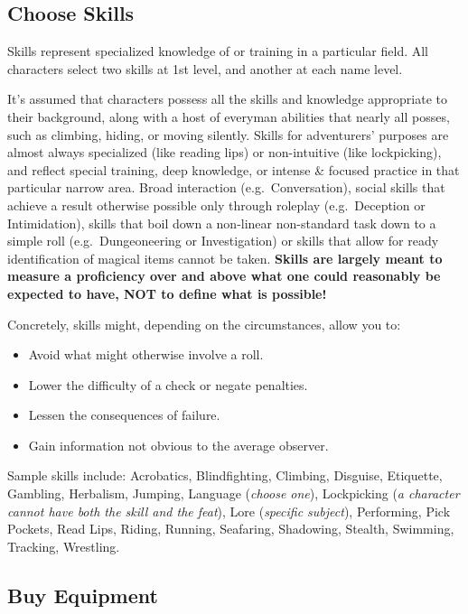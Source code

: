 \documentclass{article}
\begin{document}
\begin{multicols}{2}
\subsection{Choose Skills}\label{choose-skills}

Skills represent specialized knowledge of or training in a particular
field. All characters select two skills at 1st level, and another at
each name level.

It's assumed that characters possess all the skills and knowledge
appropriate to their background, along with a host of everyman abilities
that nearly all posses, such as climbing, hiding, or moving silently.
Skills for adventurers' purposes are almost always specialized (like
reading lips) or non-intuitive (like lockpicking), and reflect special
training, deep knowledge, or intense \& focused practice in that
particular narrow area. Broad interaction (e.g.~Conversation), social
skills that achieve a result otherwise possible only through roleplay
(e.g.~Deception or Intimidation), skills that boil down a non-linear
non-standard task down to a simple roll (e.g.~Dungeoneering or
Investigation) or skills that allow for ready identification of magical
items cannot be taken. \textbf{Skills are largely meant to measure a
proficiency over and above what one could reasonably be expected to
have, NOT to define what is possible!}

Concretely, skills might, depending on the circumstances, allow you to:

\begin{itemize}
\tightlist
\item
  Avoid what might otherwise involve a roll.
\item
  Lower the difficulty of a check or negate penalties.
\item
  Lessen the consequences of failure.
\item
  Gain information not obvious to the average observer.
\end{itemize}

Sample skills include: Acrobatics, Blindfighting, Climbing, Disguise,
Etiquette, Gambling, Herbalism, Jumping, Language (\emph{choose one}),
Lockpicking (\emph{a character cannot have both the skill and the
feat}), Lore (\emph{specific subject}), Performing, Pick Pockets, Read
Lips, Riding, Running, Seafaring, Shadowing, Stealth, Swimming,
Tracking, Wrestling.

\subsection{Buy Equipment}\label{buy-equipment}


\end{multicols}
\end{document}
